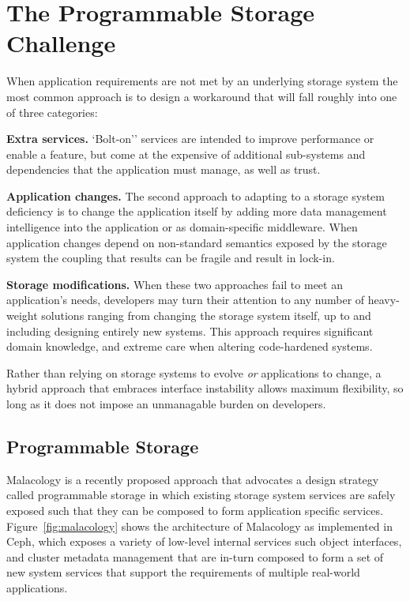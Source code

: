 \section{The Programmable Storage Challenge}
\label{sec:progly}

When application requirements are not met by an underlying storage system the
most common approach is to design a workaround that will fall roughly into one
of three categories:

{\bf Extra services.} `Bolt-on'' services are intended to improve performance
or enable a feature, but come at the expensive of additional sub-systems and
dependencies that the application must manage, as well as trust.

{\bf Application changes.} The second approach to adapting to a storage system
deficiency is to change the application itself by adding more data management
intelligence into the application or as domain-specific middleware. When
application changes depend on non-standard semantics exposed by the storage
system the coupling that results can be fragile and result in lock-in.

{\bf Storage modifications.} When these two approaches fail to meet an
application's needs, developers may turn their attention to any number of
heavy-weight solutions ranging from changing the storage system itself, up to
and including designing entirely new systems. This approach requires
significant domain knowledge, and extreme care when altering code-hardened
systems.

Rather than relying on storage systems to evolve \emph{or} applications to
change, a hybrid approach that embraces interface instability allows maximum
flexibility, so long as it does not impose an unmanagable burden on
developers.

\subsection{Programmable Storage}

Malacology is a recently proposed approach that advocates a design strategy
called programmable storage in which existing storage system services are
safely exposed such that they can be composed to form application specific
services. Figure~\ref{fig:malacology} shows the architecture of Malacology as
implemented in Ceph, which exposes a variety of low-level internal services
such object interfaces, and cluster metadata management that are in-turn
composed to form a set of new system services that support the requirements of
multiple real-world applications.


